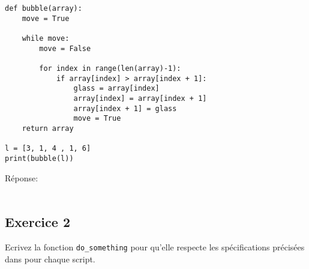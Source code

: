 \documentclass[12pt,a4paper]{article}
\newcommand{\codeintext}[1]{\texttt{#1}}
\newcommand{\response}[0]{Réponse:\hrulefill\\\\}
\begin{document}
\begin{enumerate}
\begin{lstlisting}
def bubble(array):
	move = True
	
	while move:
		move = False
			
		for index in range(len(array)-1):
			if array[index] > array[index + 1]:
				glass = array[index]
				array[index] = array[index + 1]
				array[index + 1] = glass
				move = True
	return array
	
l = [3, 1, 4 , 1, 6]
print(bubble(l))

\end{lstlisting}
\response %
\end{enumerate}
\pagebreak
\subsection*{Exercice 2}

Ecrivez la fonction \codeintext{do\_something} pour qu'elle respecte les spécifications précisées dans pour chaque script.
\end{document}
